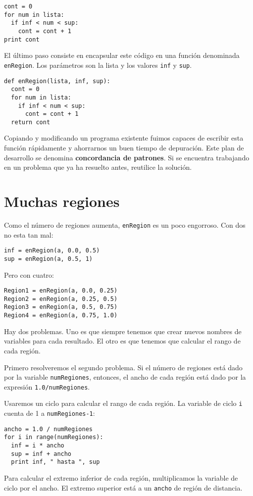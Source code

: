 \beforeverb
\begin{verbatim}
cont = 0
for num in lista:
  if inf < num < sup:
    cont = cont + 1
print cont
\end{verbatim}
\afterverb
%
El último paso consiste en  encapsular este código en una
función denominada \texttt{enRegion}.  Los parámetros son la lista
y los valores \texttt{inf} y \texttt{sup}.

\beforeverb
\begin{verbatim}
def enRegion(lista, inf, sup):
  cont = 0
  for num in lista:
    if inf < num < sup:
      cont = cont + 1
  return cont
\end{verbatim}
\afterverb
%
Copiando y modificando un programa existente fuimos capaces
de escribir esta función rápidamente y ahorrarnos un buen
tiempo de depuración. Este plan de desarrollo se denomina
{\bf concordancia de patrones}. Si se encuentra trabajando 
en un problema que ya ha resuelto antes, reutilice la 
solución.

\section{Muchas regiones}
\label{muchasregiones}

Como el número de regiones aumenta, \texttt{enRegion} es 
un poco engorroso. Con dos no esta tan mal:

\beforeverb
\begin{verbatim}
inf = enRegion(a, 0.0, 0.5)
sup = enRegion(a, 0.5, 1)
\end{verbatim}
\afterverb
%
Pero con cuatro:

\beforeverb
\begin{verbatim}
Region1 = enRegion(a, 0.0, 0.25)
Region2 = enRegion(a, 0.25, 0.5)
Region3 = enRegion(a, 0.5, 0.75)
Region4 = enRegion(a, 0.75, 1.0)
\end{verbatim}
\afterverb
%
Hay dos problemas. Uno es que siempre tenemos que crear
nuevos nombres de variables para cada resultado. El otro
es que tenemos que calcular el rango de cada región.

Primero resolveremos el segundo problema. Si el número de
regiones está dado por la variable \texttt{numRegiones}, entonces, 
el ancho de cada región está dado por la expresión \texttt{1.0/numRegiones}.

Usaremos un ciclo para calcular el rango de cada región.
La variable de ciclo \texttt{i} cuenta de 1 a \texttt{numRegiones-1}:

\beforeverb
\begin{verbatim}
ancho = 1.0 / numRegiones
for i in range(numRegiones):
  inf = i * ancho
  sup = inf + ancho
  print inf, " hasta ", sup
\end{verbatim}
\afterverb
%
Para calcular el extremo inferior de cada región, multiplicamos
la variable de ciclo por el ancho. El extremo superior está
 a un  \texttt{ancho} de región de distancia.

